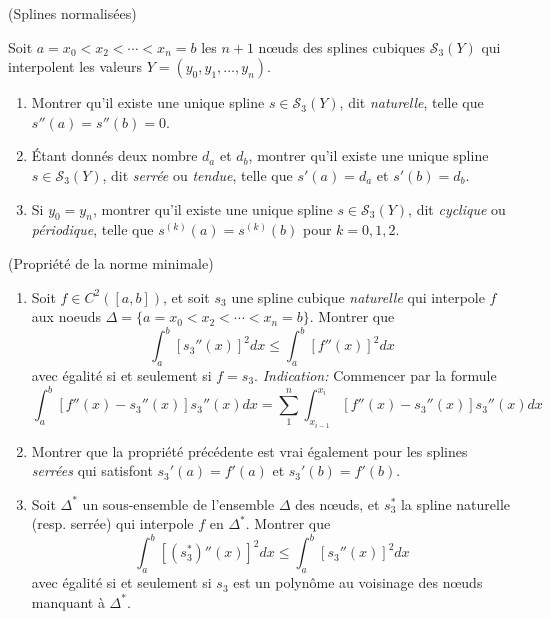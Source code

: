 \documentclass[a4paper,12pt,reqno]{amsart}
\begin{document}
\begin{exo} (Splines normalisées)

  Soit $a=x_{0}<x_{2}<\cdots<x_{n}=b$ les $n+1$ nœuds des splines cubiques $\mathcal{S}_{3}(Y)$ qui interpolent les valeurs $Y=(y_{0},y_{1},\ldots,y_{n})$.
  \begin{enumerate}
    \item Montrer qu'il existe une unique spline $s \in \mathcal{S}_{3}(Y)$, dit \emph{naturelle}, telle que $s''(a)=s''(b)=0$.

    \item Étant donnés deux nombre $d_{a}$ et $d_{b}$, montrer qu'il existe une unique spline $s \in \mathcal{S}_{3}(Y)$, dit \emph{serrée} ou \emph{tendue}, telle que $s'(a)=d_{a}$ et $s'(b)=d_{b}$.

    \item Si $y_{0}=y_{n}$, montrer qu'il existe une unique spline $s \in \mathcal{S}_{3}(Y)$, dit \emph{cyclique} ou \emph{périodique}, telle que $s^{(k)}(a)=s^{(k)}(b)$ pour $k=0,1,2$.
  \end{enumerate}
\end{exo}


\begin{exo} (Propriété de la norme minimale)
  \begin{enumerate}
    \item Soit $f \in C^{2}([a,b])$, et soit $s_{3}$ une spline cubique \textit{naturelle} qui interpole $f$ aux noeuds $\Delta=\{a=x_{0}<x_{2}<\cdots<x_{n}=b\}$. Montrer que
      $$
        \int_{a}^{b} [s_{3}''(x)]^{2} dx \leq \int_{a}^{b} [f''(x)]^{2} dx
      $$
    avec égalité si et seulement si $f=s_{3}$.\newline
    \textit{Indication:} Commencer par la formule
    $$
      \int_{a}^{b} [f''(x)-s_{3}''(x)]s_{3}''(x) dx
        = \sum_{1}^{n}\int_{x_{i-1}}^{x_{i}} [f''(x)-s_{3}''(x)]s_{3}''(x) dx
    $$

    \item Montrer que la propriété précédente est vrai également pour les splines \emph{serrées} qui satisfont $s_{3}'(a)=f'(a)$ et $s_{3}'(b)=f'(b)$.

    \item Soit $\Delta^{*}$ un sous-ensemble de l'ensemble $\Delta$ des nœuds, et $s_{3}^{*}$ la spline naturelle (resp. serrée) qui interpole $f$ en $\Delta^{*}$. Montrer que
      $$
        \int_{a}^{b} [(s_{3}^{*})''(x)]^{2} dx \leq \int_{a}^{b} [s_{3}''(x)]^{2} dx
      $$
    avec égalité si et seulement si $s_{3}$ est un polynôme au voisinage des nœuds manquant à $\Delta^{*}$.

  \end{enumerate}
\end{exo}
\end{document}
